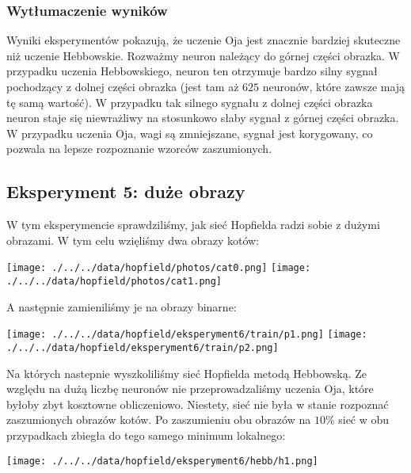 \documentclass{article}
\begin{document}
\subsubsection{Wytłumaczenie wyników}
Wyniki eksperymentów pokazują, że uczenie Oja jest znacznie bardziej skuteczne niż uczenie Hebbowskie.
Rozważmy neuron należący do górnej części obrazka. W przypadku uczenia Hebbowskiego, neuron ten otrzymuje bardzo silny sygnał
pochodzący z dolnej części obrazka (jest tam aż $625$ neuronów, które zawsze mają tę samą wartość). W przypadku tak silnego sygnału
z dolnej części obrazka neuron staje się niewrażliwy na stosunkowo słaby sygnał z górnej części obrazka.
W przypadku uczenia Oja, wagi są zmniejszane, sygnał jest korygowany, co pozwala na lepsze rozpoznanie wzorców zaszumionych.

\subsection{Eksperyment 5: duże obrazy}
W tym eksperymencie sprawdziliśmy, jak sieć Hopfielda radzi sobie z dużymi obrazami.
W tym celu wzięliśmy dwa obrazy kotów:
\begin{center}
    \texttt{[image: ./../../data/hopfield/photos/cat0.png]}
    \texttt{[image: ./../../data/hopfield/photos/cat1.png]}
\end{center}
A następnie zamieniliśmy je na obrazy binarne:
\begin{center}
    \texttt{[image: ./../../data/hopfield/eksperyment6/train/p1.png]}
    \texttt{[image: ./../../data/hopfield/eksperyment6/train/p2.png]}
\end{center}
Na których nastepnie wyszkoliliśmy sieć Hopfielda metodą Hebbowską. Ze względu na dużą liczbę neuronów
nie przeprowadzaliśmy uczenia Oja, które byłoby zbyt kosztowne obliczeniowo.
Niestety, sieć nie była w stanie rozpoznać zaszumionych obrazów kotów.
Po zaszumieniu obu obrazów na $10\%$ sieć w obu przypadkach zbiegła do tego samego minimum lokalnego:
\begin{center}
    \texttt{[image: ./../../data/hopfield/eksperyment6/hebb/h1.png]}
\end{center}
\end{document}
